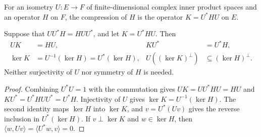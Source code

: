 \begin{definition}
    \label{def:gap_compression}
    \leanok
    For an isometry $U:E\to F$ of finite-dimensional complex inner product spaces and an
    operator $H$ on $F$, the compression of $H$ is the operator $K=U^*HU$ on $E$.
\end{definition}

\begin{lemma}
    \label{lem:gap_compression_intertwines}
    \leanok
    Suppose that $UU^*H=HUU^*$, and let $K=U^*HU$. Then
    \begin{align*}
        UK                & =HU,                         & KU^* & =U^*H, \\
        \ker K            & =U^{-1}(\ker H)=U^*(\ker H), &
        U((\ker K)^\perp) & \subseteq(\ker H)^\perp.
    \end{align*}
    Neither surjectivity of $U$ nor symmetry of $H$ is needed.
\end{lemma}
\begin{proof}\leanok
    Combining $U^*U=1$ with the commutation gives $UK=UU^*HU=HU$ and
    $KU^*=U^*HUU^*=U^*H$. Injectivity of $U$ gives $\ker K=U^{-1}(\ker H)$. The second
    identity maps $\ker H$ into $\ker K$, and $v=U^*(Uv)$ gives the reverse inclusion
    in $U^*(\ker H)$. If $v\perp\ker K$ and $w\in\ker H$, then
    $\langle w,Uv\rangle=\langle U^*w,v\rangle=0$.
\end{proof}

